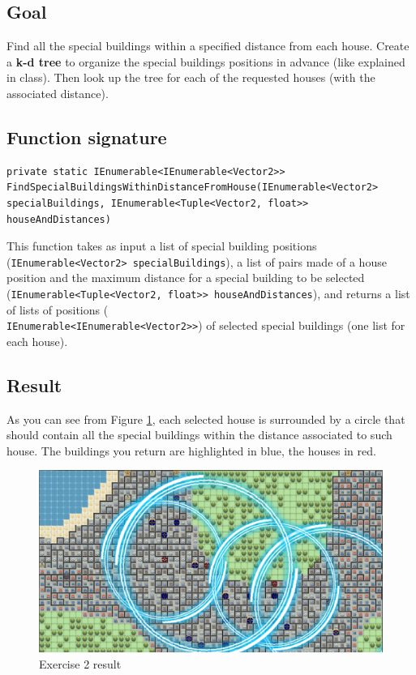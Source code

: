 \documentclass[10pt,a4paper]{article}
\begin{document}
\subsection*{Goal}
Find all the special buildings within a specified distance from each house. Create a \textbf{k-d tree} to organize the special buildings positions in advance (like explained in class). Then look up the tree for each of the requested houses (with the associated distance).

\subsection*{Function signature} 
\begin{lstlisting}
private static IEnumerable<IEnumerable<Vector2>> FindSpecialBuildingsWithinDistanceFromHouse(IEnumerable<Vector2> specialBuildings, IEnumerable<Tuple<Vector2, float>> houseAndDistances)
\end{lstlisting}

\noindent
This function takes as input a list of special building positions (\texttt{IEnumerable<Vector2> specialBuildings}), a list of pairs made of a house position and the maximum distance for a special building to be selected (\texttt{IEnumerable<Tuple<Vector2, float>> houseAndDistances}), and returns a list of lists of positions (\\ \texttt{IEnumerable<IEnumerable<Vector2>>}) of selected special buildings (one list for each house).\\

\subsection*{Result}
As you can see from Figure \ref{img:Ex2}, each selected house is surrounded by a circle that should contain all the special buildings within the distance associated to such house. The buildings you return are highlighted in blue, the houses in red.

\begin{figure}[!h]
\centering
\includegraphics[scale=0.25]{img/exercise2}
\caption{Exercise 2 result}
\label{img:Ex2}
\end{figure}
\end{document}
